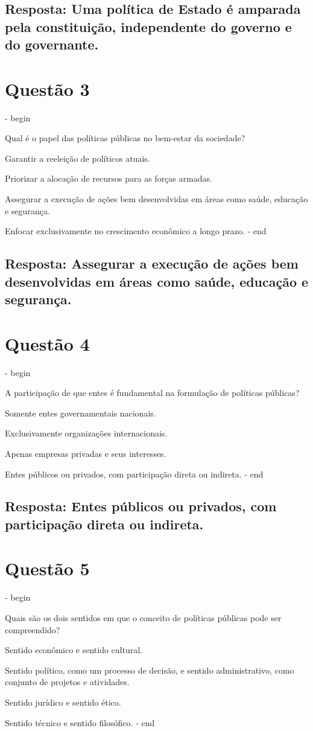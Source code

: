 \documentclass[
   article,       
   12pt,          
   oneside,       
   a4paper,       
   english,       
   brazil,        
   sumario=tradicional
   ]{abntex2}
\begin{document}
\subsection{Resposta: Uma política de Estado é amparada pela constituição, independente do governo e do governante.}

\section{Questão 3}
\itemize - begin
\item Qual é o papel das políticas públicas no bem-estar da sociedade?
\item Garantir a reeleição de políticos atuais.
\item Priorizar a alocação de recursos para as forças armadas.
\item Assegurar a execução de ações bem desenvolvidas em áreas como saúde, educação e segurança.
\item Enfocar exclusivamente no crescimento econômico a longo prazo.
\itemize - end
\subsection{Resposta: Assegurar a execução de ações bem desenvolvidas em áreas como saúde, educação e segurança.}

\section{Questão 4}
\itemize - begin
\item A participação de que entes é fundamental na formulação de políticas públicas?
\item Somente entes governamentais nacionais.
\item Exclusivamente organizações internacionais.
\item Apenas empresas privadas e seus interesses.
\item Entes públicos ou privados, com participação direta ou indireta.
\itemize - end
\subsection{Resposta: Entes públicos ou privados, com participação direta ou indireta.}

\section{Questão 5}
\itemize - begin
\item Quais são os dois sentidos em que o conceito de políticas públicas pode ser compreendido?
\item Sentido econômico e sentido cultural.
\item Sentido político, como um processo de decisão, e sentido administrativo, como conjunto de projetos e atividades.
\item Sentido jurídico e sentido ético.
\item Sentido técnico e sentido filosófico.
\itemize - end
\end{document}
